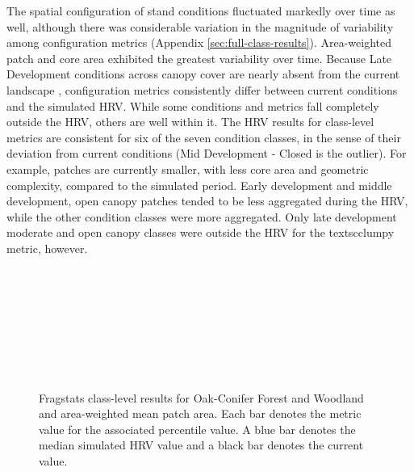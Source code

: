 The spatial configuration of stand conditions fluctuated markedly over time as well, although there was considerable variation in the magnitude of variability among configuration metrics (Appendix \ref{sec:full-class-results}). Area-weighted patch and core area exhibited the greatest variability over time. Because Late Development conditions across canopy cover are nearly absent from the current landscape , configuration metrics consistently differ between current conditions and the simulated HRV. While some conditions and metrics fall completely outside the HRV, others are well within it. The HRV results for class-level metrics are consistent for six of the seven condition classes, in the sense of their deviation from current conditions (Mid Development - Closed is the outlier). For example, patches are currently smaller, with less core area and geometric complexity, compared to the simulated period. Early development and middle development, open canopy patches tended to be less aggregated during the HRV, while the other condition classes were more aggregated. Only late development moderate and open canopy classes were outside the HRV for the textsc{clumpy} metric, however.


\begin{figure}[!htbp]
  \\%
  \\%
    \\%
    \\%
    \\%
    \\%
    \\%
  \caption{Fragstats class-level results for Oak-Conifer Forest and Woodland and area-weighted mean patch area. Each bar denotes the metric value for the associated percentile value. A blue bar denotes the median simulated HRV value and a black bar denotes the current value.}
  \label{fig:ocfw_areaam}
\end{figure}


